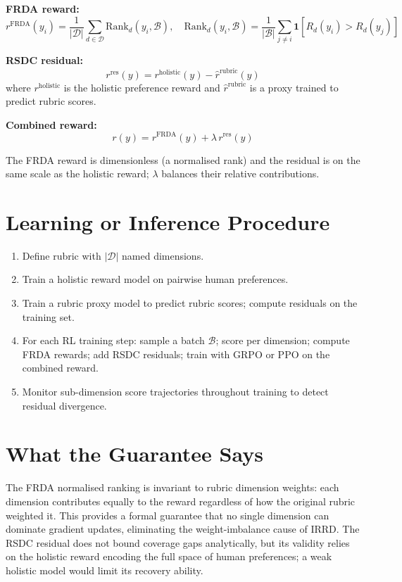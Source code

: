 \documentclass[10pt,twocolumn]{article}
\begin{document}
\textbf{FRDA reward:}
\[
r^{\text{FRDA}}(y_i) = \frac{1}{|\mathcal{D}|}\sum_{d\in\mathcal{D}}
  \text{Rank}_d(y_i,\mathcal{B}),
\quad
\text{Rank}_d(y_i,\mathcal{B}) = \frac{1}{|\mathcal{B}|}
  \sum_{j\neq i}\mathbf{1}[R_d(y_i) > R_d(y_j)]
\]

\textbf{RSDC residual:}
\[
r^{\text{res}}(y) = r^{\text{holistic}}(y) - \hat{r}^{\text{rubric}}(y)
\]
where $r^{\text{holistic}}$ is the holistic preference reward and
$\hat{r}^{\text{rubric}}$ is a proxy trained to predict rubric scores.

\textbf{Combined reward:}
\[
r(y) = r^{\text{FRDA}}(y) + \lambda\, r^{\text{res}}(y)
\]

The FRDA reward is dimensionless (a normalised rank) and the residual is
on the same scale as the holistic reward; $\lambda$ balances their
relative contributions.

\section{Learning or Inference Procedure}

\begin{enumerate}[itemsep=2pt,parsep=0pt]
  \item Define rubric with $|\mathcal{D}|$ named dimensions.
  \item Train a holistic reward model on pairwise human preferences.
  \item Train a rubric proxy model to predict rubric scores; compute
    residuals on the training set.
  \item For each RL training step: sample a batch $\mathcal{B}$; score
    per dimension; compute FRDA rewards; add RSDC residuals; train with
    GRPO or PPO on the combined reward.
  \item Monitor sub-dimension score trajectories throughout training to
    detect residual divergence.
\end{enumerate}

\section{What the Guarantee Says}

The FRDA normalised ranking is invariant to rubric dimension weights: each
dimension contributes equally to the reward regardless of how the original
rubric weighted it. This provides a formal guarantee that no single dimension
can dominate gradient updates, eliminating the weight-imbalance cause of
IRRD. The RSDC residual does not bound coverage gaps analytically, but its
validity relies on the holistic reward encoding the full space of human
preferences; a weak holistic model would limit its recovery ability.
\end{document}

